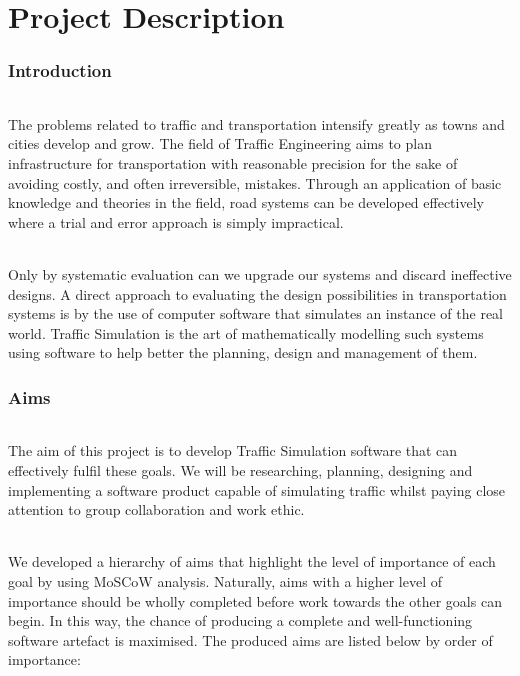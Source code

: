 \documentclass[11pt,a4paper]{article}
\begin{document}
\part*{Project Description}

\section{Introduction}
\paragraph{}
The problems related to traffic and transportation intensify greatly as towns and cities develop and grow. The field of Traffic Engineering aims to plan infrastructure for transportation with reasonable precision for the sake of avoiding costly, and often irreversible, mistakes. Through an application of basic knowledge and theories in the field, road systems can be developed effectively where a trial and error approach is simply impractical.

\paragraph{}
Only by systematic evaluation can we upgrade our systems and discard ineffective designs. A direct approach to evaluating the design possibilities in transportation systems is by the use of computer software that simulates an instance of the real world. Traffic Simulation is the art of mathematically modelling such systems using software to help better the planning, design and management of them.

\section{Aims}
\paragraph{}
The aim of this project is to develop Traffic Simulation software that can effectively fulfil these goals. We will be researching, planning, designing and implementing a software product capable of simulating traffic whilst paying close attention to group collaboration and work ethic.

\paragraph{}
We developed a hierarchy of aims that highlight the level of importance of each goal by using MoSCoW analysis. Naturally, aims with a higher level of importance should be wholly completed before work towards the other goals can begin. In this way, the chance of producing a complete and well-functioning software artefact is maximised. The produced aims are listed below by order of importance:
\end{document}
